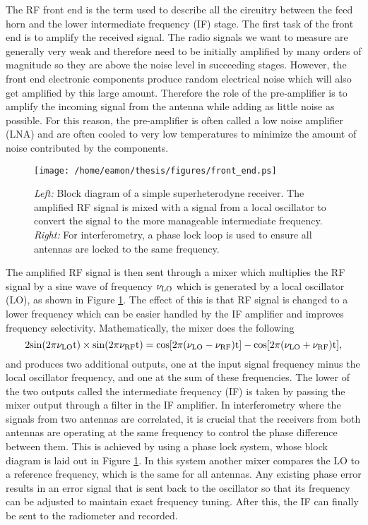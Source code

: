 The RF front end is the term used to describe all the circuitry between  the feed horn and the lower intermediate frequency (IF) stage. The first task of the front end is to amplify the received signal. The radio signals we want to measure are generally very weak and therefore need to be initially amplified by many orders of magnitude so they are above the noise level in succeeding stages. However, the front end electronic components produce random electrical noise which will also get amplified by this large amount. Therefore the role of the pre-amplifier is to amplify the incoming signal from the antenna while adding as little noise as possible. For this reason, the pre-amplifier is often called a low noise amplifier (LNA) and are often cooled to very low temperatures to minimize the amount of noise contributed by the components.

\begin{figure}[hbt!]
\centering 
          \texttt{[image: /home/eamon/thesis/figures/front\_end.ps]}
\caption[Block diagram of a superheterodyne receiver.]{\textit{Left:} Block diagram of a simple superheterodyne receiver. The amplified RF signal is mixed with a signal from a local oscillator to convert the signal to the more manageable intermediate frequency. \textit{Right:} For interferometry, a phase lock loop is used to ensure all antennas are locked to the same frequency.}
\label{fig2d1}
\end{figure}

The amplified RF signal is then sent through a mixer which multiplies the RF signal by a sine wave of frequency $\nu _{\rm{LO}}$ which is generated by a local oscillator (LO), as shown in Figure \ref{fig2d1}. The effect of this is that RF signal is changed to a lower frequency which can be easier handled by the IF amplifier and  improves frequency selectivity. Mathematically, the mixer does the following
\begin{equation}
2\rm{sin}(2\pi \nu _{\rm{LO}}t)\times \rm{sin}(2\pi \nu _{\rm{RF}}t) = \rm{cos}[2\pi (\nu _{\rm{LO}}-\nu _{\rm{RF}})t]-\rm{cos}[2\pi (\nu _{\rm{LO}}+\nu _{\rm{RF}})t],
\end{equation}
and produces two additional outputs, one at the input signal frequency minus the local oscillator frequency, and one at the sum of these frequencies. The lower of the two outputs called the intermediate frequency (IF) is taken by passing the mixer output through a filter in the IF amplifier. In interferometry where the signals from two antennas are correlated, it is crucial that the receivers from both antennas are operating at the same frequency to control the phase difference between them. This is achieved by using a phase lock system, whose block diagram is laid out in Figure \ref{fig2d1}. In this system another mixer compares the LO to a reference frequency, which is the same for all antennas. Any existing phase error results in an error signal that is sent back to the oscillator so that its frequency can be adjusted to maintain exact frequency tuning. After this, the IF can finally be sent to the radiometer and recorded.


